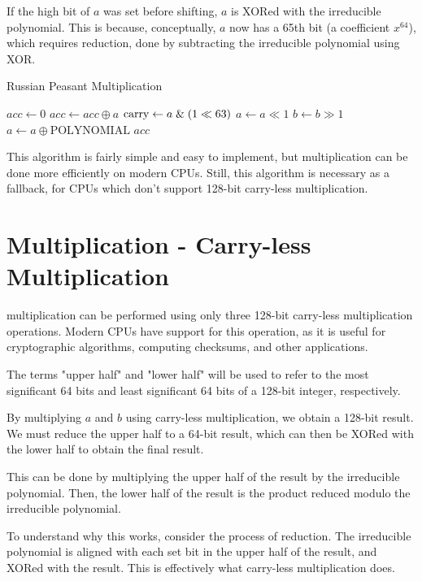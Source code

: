 If the high bit of $a$ was set before shifting, $a$ is XORed with the irreducible polynomial.
This is because, conceptually, $a$ now has a 65th bit (a coefficient $x^{64}$), which requires reduction, done by subtracting the irreducible polynomial using XOR.

\begin{algorithm}
\caption{Russian Peasant Multiplication}
\begin{algorithmic}
\State $acc \gets 0$
        \State $acc \gets acc \oplus a$
    \EndIf
    \State $\text{carry} \gets a \;\&\; (1 \ll 63)$
    \State $a \gets a \ll 1$
    \State $b \gets b \gg 1$
        \State $a \gets a \oplus \text{POLYNOMIAL}$
    \EndIf
\EndFor
\State \Return $acc$
\EndFunction
\end{algorithmic}
\end{algorithm}


This algorithm is fairly simple and easy to implement, but multiplication can be done more efficiently on modern CPUs.
Still, this algorithm is necessary as a fallback, for CPUs which don't support 128-bit carry-less multiplication.

\section{Multiplication - Carry-less Multiplication}

 multiplication can be performed using only three 128-bit carry-less multiplication operations.
Modern CPUs have support for this operation, as it is useful for cryptographic algorithms, computing checksums, and other applications. \cite{intel-clmul}

The terms "upper half" and "lower half" will be used to refer to the most significant 64 bits and least significant 64 bits of a 128-bit integer, respectively.

By multiplying $a$ and $b$ using carry-less multiplication, we obtain a 128-bit result.
We must reduce the upper half to a 64-bit result, which can then be XORed with the lower half to obtain the final result.

This can be done by multiplying the upper half of the result by the irreducible polynomial.
Then, the lower half of the result is the product reduced modulo the irreducible polynomial.

To understand why this works, consider the process of reduction.
The irreducible polynomial is aligned with each set bit in the upper half of the result, and XORed with the result.
This is effectively what carry-less multiplication does.

